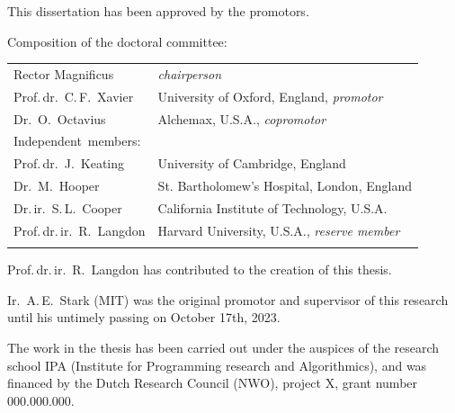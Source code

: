\begin{titlepage}
\begin{center}
\end{center}
\clearpage




\thispagestyle{empty}

\noindent This dissertation has been approved by the promotors.

\medskip

\noindent Composition of the doctoral committee:

\medskip\noindent
\begin{tabular}{p{4.5cm}l}
  Rector Magnificus & \emph{chairperson} \\
  Prof.\,dr.\ C.\,F.\ Xavier & University of Oxford, England, \emph{promotor} \\
  Dr.\ O.\ Octavius & Alchemax, U.S.A., \emph{copromotor} \\

  \medskip
  \mbox{Independent members:} & \\
  
  Prof.\,dr.\ J.\ Keating & University of Cambridge, England \\
  Dr.\ M.\ Hooper & St. Bartholomew's Hospital, London, England \\
  Dr.\,ir.\ S.\,L.\ Cooper & California Institute of Technology, U.S.A. \\
  
  Prof.\,dr.\,ir.\ R.\ Langdon & Harvard University, U.S.A., \emph{reserve member} \\ \\

\end{tabular}

\medskip
\noindent Prof.\,dr.\,ir.\ R.\ Langdon has contributed to the creation of this thesis.

\medskip
\medskip

\noindent Ir.\ A.\,E.\ Stark (MIT) was the original promotor and supervisor of this research until his untimely passing on October 17th, 2023.
\medskip

\noindent The work in the thesis has been carried out under the auspices of the research school IPA
(Institute for Programming research and Algorithmics), and was financed by the Dutch Research Council (NWO), project X, grant number 000.000.000.


\end{titlepage}
